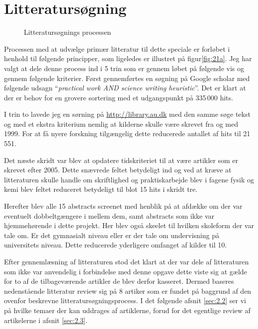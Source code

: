\section{Litteratursøgning}
\label{sec:2.1}


\begin{wrapfigure}{o}{0.5\textwidth}
	\centering
	\caption{Litteratursøgnings processen}
	\label{fig:21a}
\end{wrapfigure}

Processen med at udvælge primær litteratur til dette speciale er forløbet i henhold til følgende principper, som ligeledes er illustret på  figur\vref{fig:21a}. Jeg har valgt at dele denne process ind i 5 trin som er gennem løbet på følgende vis og gennem følgende kriterier. Først gennemførtes en søgning på Google scholar med følgende udsagn ``\emph{practical work AND science writing heuristic}''. Det er klart at der er behov for en grovere sortering med et udgangspunkt på 335\,000 hits. 

I trin to lavede jeg en sørning på \url{http://library.au.dk} med den samme søge tekst og med et ekstra kriterium nemlig at kilderne skulle være skrevet fra og med 1999. For at få nyere forskning tilgængelig dette reducerede antallet af hits til 21\,551. 

Det næste skridt var blev at opdatere tidskriteriet til at være artikler som er skrevet efter 2005. Dette snævrede feltet betydeligt ind og ved at kræve at litteraturen skulle handle om skriftlighed og praktiskarbejde blev i fagene fysik og kemi blev feltet reduceret betydeligt til blot 15 hits i skridt tre.

Herefter blev alle 15 abstracts screenet med henblik på at afdække om der var eventuelt dobbeltgængere i mellem dem, samt abstracts som ikke var hjemmehørende i dette projekt. Her blev også skeelet til hvilken skoleform der var tale om. Er det gymnasialt niveau eller er der tale om undervisning på universitets niveau. Dette reducerede yderligere omfanget af kilder til 10.

Efter gennemlæsning af litteraturen stod det klart at der var dele af litteraturen som ikke var anvendelig i forbindelse med denne opgave dette viste sig at gælde for to af de tilbageværende artikler de blev derfor kasseret. Dermed baseres nedenstående litteratur review sig på 8 artiker som er fundet på baggrund af den ovenfor beskrevne litteratursøgningsprocess. I det følgende afsnit \vref{sec:2.2} ser vi på hvilke temaer der kan uddrages af artiklerne, forud for det egentlige review af artikelerne i afsnit \vref{sec:2.3}. 


